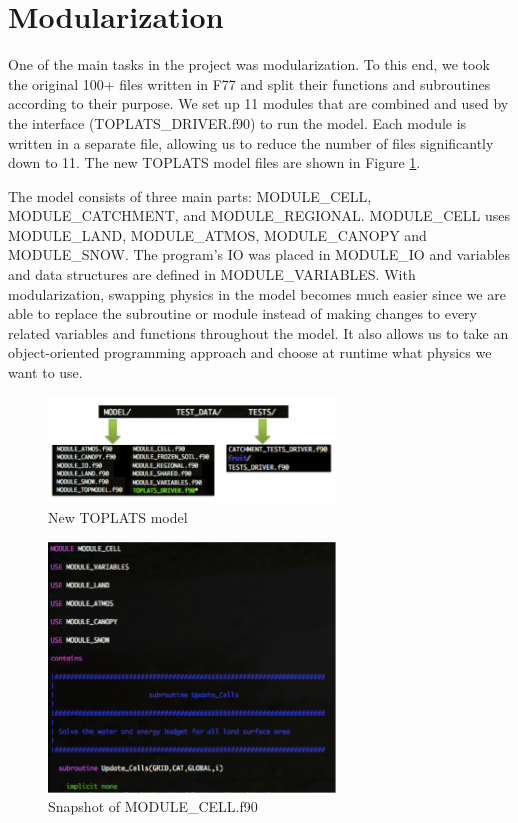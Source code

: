 \documentclass[pdftex,12pt,a4paper]{article}
\begin{document}
\section{Modularization}
One of the main tasks in the project was modularization. To this end, we took the original 100+ files written in F77 and split their functions and subroutines according to their purpose.  We set up 11 modules that are combined and used by the interface (TOPLATS\_DRIVER.f90) to run the model. Each module is written in a separate file, allowing us to reduce the number of files significantly down to 11.  The new TOPLATS model files are shown in Figure \ref{Modules1}. 

The model consists of three main parts: MODULE\_CELL,  MODULE\_CATCHMENT, and MODULE\_REGIONAL. MODULE\_CELL uses MODULE\_LAND, MODULE\_ATMOS, MODULE\_CANOPY and MODULE\_SNOW. The program's IO was placed in MODULE\_IO and variables and data structures are defined in MODULE\_VARIABLES. With modularization, swapping physics in the model becomes much easier since we are able to replace the subroutine or module instead of making changes to every related variables and functions throughout the model. It also allows us to take an object-oriented programming approach and choose at runtime what physics we want to use.

\begin{figure}[h]
	\centering
	\includegraphics[width=3.0in]{Figures/Modules1.png}
	\caption{New TOPLATS model}
	\label{Modules1}
\end{figure}

\begin{figure}[h]
	\centering
	\includegraphics[width=3.0in]{Figures/Modules2.png}
	\caption{Snapshot of MODULE\_CELL.f90}
	\label{Modules2}
\end{figure}
\end{document}

